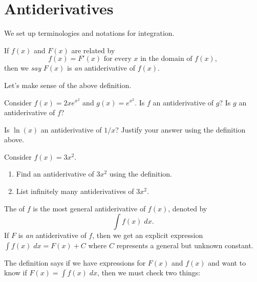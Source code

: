 \documentclass[../main.tex]{subfiles}
\begin{document}
 \section{Antiderivatives}
  We set up terminologies and notations for integration.

  \begin{mdframed}[style=withref-compact]
    If \(f(x)\) and \(F(x)\) are related by
    \[
      f(x) = F'(x) \text{ for every } x \text{ in the domain of } f(x),
    \]
    then we \emph{say} \(F(x)\) is \emph{an} antiderivative of \(f(x)\).
  \end{mdframed}

  Let's make sense of the above definition.
  \begin{example}
    Consider \(f(x) = 2xe^{x^{2}}\) and \(g(x) = e^{x^{2}}\). Is \(f\) an antiderivative of \(g\)? Is \(g\) an antiderivative of \(f\)?
  \end{example}

  \begin{example}
    Is \(\ln(x)\) an antiderivative of \(1/x\)? Justify your answer using the definition above.

  \end{example}

  \begin{example}
    Consider \(f(x) = 3x^{2}\).

    \begin{enumerate}
      \item Find an antiderivative of \(3x^{2}\) using the definition.
      \item List infinitely many antiderivatives of \(3x^{2}\).
    \end{enumerate}
  \end{example}
  \clearpage

  \begin{mdframed}[style=withref-compact]
    The  of \(f\) is the most general antiderivative of \(f(x)\), denoted by 
    \[
      \int f(x) \;dx.
    \]
    If \(F\) is \emph{an} antiderivative of \(f\), then we get an explicit expression \(\int f(x) \;dx = F(x) + C\) where \(C\) represents a general but unknown constant.

  \end{mdframed}
  The definition says if we have expressions for \(F(x)\) and \(f(x)\) and want to know if \(F(x) = \int f(x) \;dx\), then we must check two things:
\end{document}
